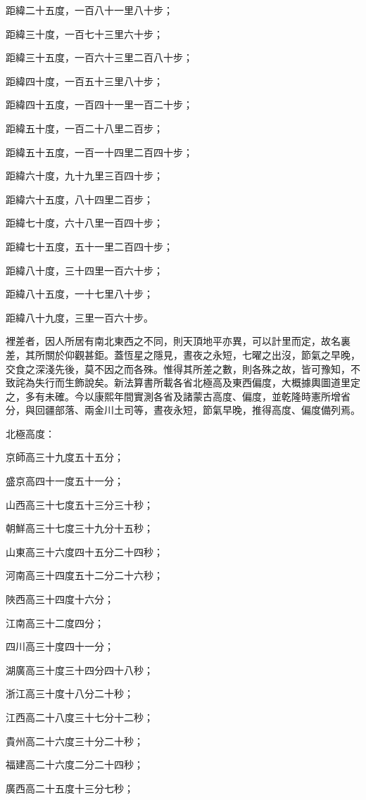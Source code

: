 \begin{pinyinscope}
距緯二十五度，一百八十一里八十步；

距緯三十度，一百七十三里六十步；

距緯三十五度，一百六十三里二百八十步；

距緯四十度，一百五十三里八十步；

距緯四十五度，一百四十一里一百二十步；

距緯五十度，一百二十八里二百步；

距緯五十五度，一百一十四里二百四十步；

距緯六十度，九十九里三百四十步；

距緯六十五度，八十四里二百步；

距緯七十度，六十八里一百四十步；

距緯七十五度，五十一里二百四十步；

距緯八十度，三十四里一百六十步；

距緯八十五度，一十七里八十步；

距緯八十九度，三里一百六十步。

裡差者，因人所居有南北東西之不同，則天頂地平亦異，可以計里而定，故名裏差，其所關於仰觀甚鉅。蓋恆星之隱見，晝夜之永短，七曜之出沒，節氣之早晚，交食之深淺先後，莫不因之而各殊。惟得其所差之數，則各殊之故，皆可豫知，不致詫為失行而生飾說矣。新法算書所載各省北極高及東西偏度，大概據輿圖道里定之，多有未確。今以康熙年間實測各省及諸蒙古高度、偏度，並乾隆時憲所增省分，與回疆部落、兩金川土司等，晝夜永短，節氣早晚，推得高度、偏度備列焉。

北極高度：

京師高三十九度五十五分；

盛京高四十一度五十一分；

山西高三十七度五十三分三十秒；

朝鮮高三十七度三十九分十五秒；

山東高三十六度四十五分二十四秒；

河南高三十四度五十二分二十六秒；

陜西高三十四度十六分；

江南高三十二度四分；

四川高三十度四十一分；

湖廣高三十度三十四分四十八秒；

浙江高三十度十八分二十秒；

江西高二十八度三十七分十二秒；

貴州高二十六度三十分二十秒；

福建高二十六度二分二十四秒；

廣西高二十五度十三分七秒；


\end{pinyinscope}
